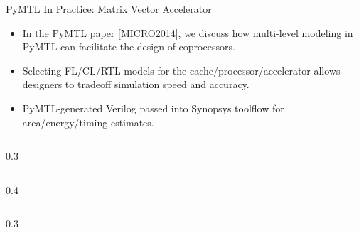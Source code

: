 \begin{frame}{PyMTL In Practice: Matrix Vector Accelerator}

\begin{itemize}
  \item In the PyMTL paper [MICRO2014], we discuss how multi-level modeling
        in PyMTL can facilitate the design of coprocessors.
  \item Selecting FL/CL/RTL models for the cache/processor/accelerator
        allows designers to tradeoff simulation speed and accuracy.
  \item PyMTL-generated Verilog passed into Synopsys toolflow for
        area/energy/timing estimates.
\end{itemize}

  \begin{cbxcols}
  \begin{column}{0.3\tw}
  \end{column}

  \begin{column}{0.4\tw}
  \vspace{0.2in}
  \end{column}

  \begin{column}{0.3\tw}
  \end{column}
  \end{cbxcols}

\end{frame}

